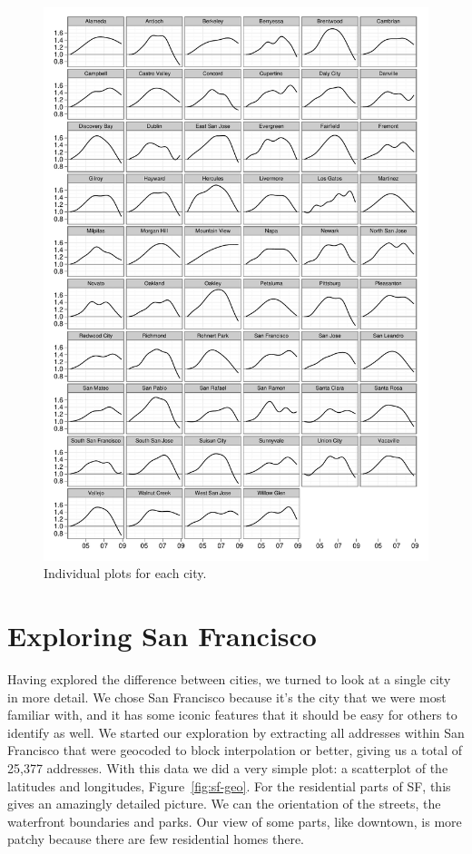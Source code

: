 \documentclass[oneside]{article}
\begin{document}
\begin{figure}[htbp]
  \centering
  \includegraphics[width=0.9\linewidth]{cities-individual}
  \caption{Individual plots for each city.}
  \label{fig:individual}
\end{figure}

\section{Exploring San Francisco}

Having explored the difference between cities, we turned to look at a single city in more detail.  We chose San Francisco because it's the city that we were most familiar with, and it has some iconic features that it should be easy for others to identify as well.  We started our exploration by extracting all addresses within San Francisco that were geocoded to block interpolation or better, giving us a total of 25,377 addresses.  With this data we did a very simple plot: a scatterplot of the latitudes and longitudes, Figure~\ref{fig:sf-geo}.  For the residential parts of SF, this gives an amazingly detailed picture.  We can the orientation of the streets, the waterfront boundaries and parks.  Our view of some parts, like downtown, is more patchy because there are few residential homes there.
\end{document}
